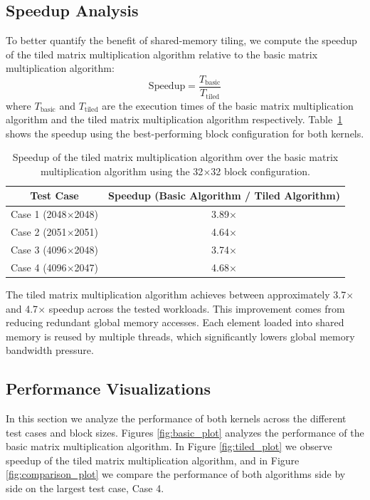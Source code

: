 \documentclass[11pt]{article}
\begin{document}
\subsection{Speedup Analysis}

To better quantify the benefit of shared-memory tiling, we compute the
speedup of the tiled matrix multiplication algorithm relative to the basic matrix multiplication algorithm:
\[
\text{Speedup} = \frac{T_{\text{basic}}}{T_{\text{tiled}}}
\]
where $T_{\text{basic}}$ and $T_{\text{tiled}}$ are the execution times
of the basic matrix multiplication algorithm and the tiled matrix multiplication algorithm respectively.
Table~\ref{tab:speedup_data} shows the speedup using the best-performing
block configuration for both kernels.

\begin{table}[H]
\centering
\begin{tabular}{|c|c|}
\hline
\textbf{Test Case} & \textbf{Speedup (Basic Algorithm / Tiled Algorithm)} \\
\hline
Case 1 (2048$\times$2048) & 3.89$\times$ \\
Case 2 (2051$\times$2051) & 4.64$\times$ \\
Case 3 (4096$\times$2048) & 3.74$\times$ \\
Case 4 (4096$\times$2047) & 4.68$\times$ \\
\hline
\end{tabular}
\caption{Speedup of the tiled matrix multiplication algorithm over the basic matrix multiplication algorithm using the 32$\times$32 block configuration.}
\label{tab:speedup_data}
\end{table}

The tiled matrix multiplication algorithm achieves between approximately
3.7$\times$ and 4.7$\times$ speedup across the tested workloads.
This improvement comes from reducing redundant global memory accesses.
Each element loaded into shared memory is reused by multiple threads,
which significantly lowers global memory bandwidth pressure.

\subsection{Performance Visualizations}
In this section we analyze the performance of both kernels
 across the different test cases and block sizes.
Figures \ref{fig:basic_plot} analyzes the performance of the
basic matrix multiplication algorithm. In Figure \ref{fig:tiled_plot} we observe
speedup of the tiled matrix multiplication algorithm, and in Figure
 \ref{fig:comparison_plot} we compare the performance of both algorithms
 side by side on the largest test case, Case 4.
\end{document}
